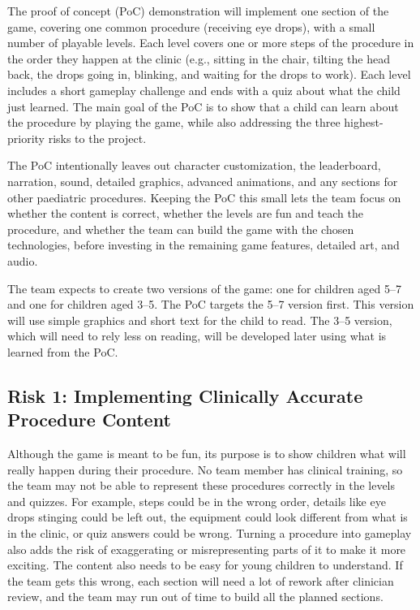 \documentclass{article}
\begin{document}
\noindent The proof of concept (PoC) demonstration will implement one section of
the game, covering one common procedure (receiving eye drops), with a small
number of playable levels. Each level covers one or more steps of the procedure
in the order they happen at the clinic (e.g., sitting in the chair, tilting the
head back, the drops going in, blinking, and waiting for the drops to work).
Each level includes a short gameplay challenge and ends with a quiz about what
the child just learned. The main goal of the PoC is to show
that a child can learn about the procedure by playing the game, while also
addressing the three highest-priority risks to the project.

\noindent The PoC intentionally leaves out character customization, the
leaderboard, narration, sound, detailed graphics, advanced animations, and any
sections for other paediatric procedures. Keeping the PoC this small lets the
team focus on whether the content is correct, whether the levels are fun and
teach the procedure, and whether the team can build the game with the chosen
technologies, before investing in the remaining game features, detailed art,
and audio.

\noindent The team expects to create two versions of the game: one for children
aged 5--7 and one for children aged 3--5. The PoC targets the 5--7 version
first. This version will use simple graphics and short text for the child to
read. The 3--5 version, which will need to rely less on reading, will be
developed later using what is learned from the PoC.

\subsection{Risk 1: Implementing Clinically Accurate Procedure Content}

Although the game is meant to be fun, its purpose is to show children what will
really happen during their procedure. No team member has clinical training, so
the team may not be able to represent these procedures correctly in the levels
and quizzes. For example, steps could be in the wrong order, details like eye
drops stinging could be left out, the equipment could look different from what
is in the clinic, or quiz answers could be wrong. Turning a procedure into
gameplay also adds the risk of exaggerating or misrepresenting parts of it to
make it more exciting. The content also needs to be easy for young children to
understand. If the team gets this wrong, each section will need a lot of rework
after clinician review, and the team may run out of time to build all the
planned sections.
\end{document}
